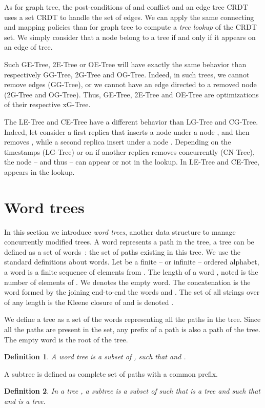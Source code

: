 \documentclass[a4paper]{article}
\newtheorem{definition}{Definition}
\begin{document}
As for graph tree, the post-conditions of  and  conflict and
an edge tree CRDT uses a set CRDT to handle the set of edges.  We can
apply the same connecting and mapping policies than for graph tree to
compute a {\em tree lookup} of the CRDT set. We simply consider that a
node belong to a tree if and only if it appears on an edge of tree.

Such GE-Tree, 2E-Tree or OE-Tree will have exactly the same behavior
than respectively GG-Tree, 2G-Tree and OG-Tree. Indeed, in such trees,
we cannot remove edges (GG-Tree), or we cannot have an edge directed
to a removed node (2G-Tree and OG-Tree). Thus, GE-Tree, 2E-Tree and
OE-Tree are optimizations of their respective xG-Tree.

The LE-Tree and CE-Tree have a different behavior than LG-Tree and
CG-Tree. Indeed, let consider a first replica that inserts a node 
under a node , and then removes , while a second replica insert
 under a node . Depending on the timestamps (LG-Tree) or on if
another replica removes  concurrently (CN-Tree), the node  --
and thus  -- can appear or not in the lookup. In LE-Tree and
CE-Tree,  appears in the lookup.

\section{Word trees}
\label{sec:word}

In this section we introduce {\em word trees}, another data structure
to manage concurrently modified trees. A word represents a path in the
tree, a tree can be defined as a set of words~: the set of paths
existing in this tree. We use the standard definitions about words.
Let  be a finite -- or infinite -- ordered alphabet, a word is a
finite sequence of elements from . The length of a word ,
noted  is the number of elements of . We denotes  the
empty word. The concatenation  is the word formed by the joining
end-to-end the words  and . The set of all strings over  of
any length is the Kleene closure of  and is denoted .

We define a tree as a set of the words representing all the paths in
the tree. Since all the paths are present in the set, any prefix of a
path is also a path of the tree. The empty word  is the root of
the tree.
\begin{definition}
  A word tree  is a subset of , such that  and
  .
\end{definition}

A subtree is defined as complete set of paths with a common prefix.
\begin{definition}
  In a tree , a subtree  is a subset of  such that  is a tree and such that  and  is a tree.
\end{definition}
\end{document}
